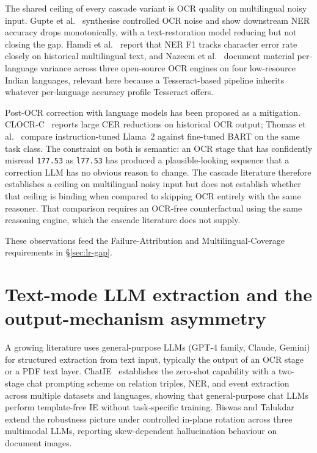 The shared ceiling of every cascade variant is OCR quality on
multilingual noisy input. Gupte et al.~\cite{gupte2021lightscameras}
synthesise controlled OCR noise and show downstream NER accuracy
drops monotonically, with a text-restoration model reducing but not
closing the gap. Hamdi et al.~\cite{hamdi2023ocrner} report that NER
F1 tracks character error rate closely on historical multilingual
text, and Nazeem et al.~\cite{nazeem2024ocrlow} document material
per-language variance across three open-source OCR engines on four
low-resource Indian languages, relevant here because a Tesseract-based
pipeline inherits whatever per-language accuracy profile Tesseract
offers.

Post-OCR correction with language models has been proposed as a
mitigation. CLOCR-C~\cite{bourne2024clocrc} reports large CER
reductions on historical OCR output; Thomas et
al.~\cite{thomas2024postocr} compare instruction-tuned Llama~2
against fine-tuned BART on the same task class. The constraint on
both is semantic: an OCR stage that has confidently misread
\texttt{177.53} as \texttt{l77.53} has produced a plausible-looking
sequence that a correction LLM has no obvious reason to change. The
cascade literature therefore establishes a ceiling on multilingual
noisy input but does not establish whether that ceiling is binding
when compared to skipping OCR entirely with the same reasoner. That
comparison requires an OCR-free counterfactual using the same
reasoning engine, which the cascade literature does not supply.

These observations feed the Failure-Attribution and
Multilingual-Coverage requirements in \S\ref{sec:lr-gap}.

\section{Text-mode LLM extraction and the output-mechanism asymmetry}
\label{sec:lr-textmode}

A growing literature uses general-purpose LLMs (GPT-4 family, Claude,
Gemini) for structured extraction from text input, typically the
output of an OCR stage or a PDF text layer.
ChatIE~\cite{wei2023chatie} establishes the zero-shot capability with
a two-stage chat prompting scheme on relation triples, NER, and event
extraction across multiple datasets and languages, showing that
general-purpose chat LLMs perform template-free IE without
task-specific training. Biswas and Talukdar~\cite{biswas2024rotation}
extend the robustness picture under controlled in-plane rotation
across three multimodal LLMs, reporting skew-dependent hallucination
behaviour on document images.

